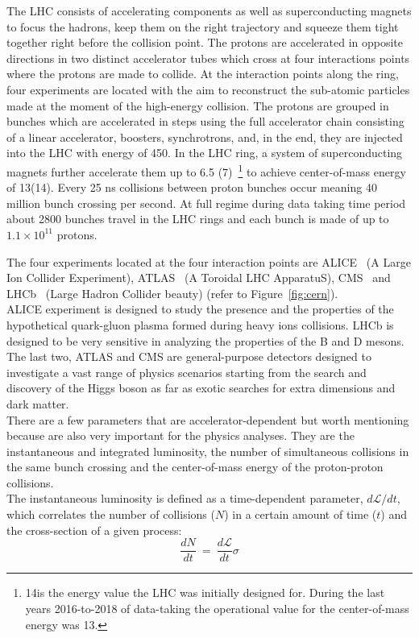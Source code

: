 The LHC consists of accelerating components as well as
superconducting magnets to focus the hadrons, keep them on the right
trajectory and squeeze them tight together right before the
collision point. 
The protons are accelerated in opposite directions in two distinct
accelerator tubes which cross at four interactions points where the
protons are made to collide. At the interaction points along the ring,
four experiments are located with the aim to reconstruct the
sub-atomic particles made at the moment of the high-energy collision.
The protons are grouped in bunches which are
accelerated in steps using the full accelerator chain consisting of a linear
accelerator, boosters, synchrotrons, and, in the end, they are injected
into the LHC with energy of 450\GeV. In the LHC ring, a system of
superconducting magnets further accelerate them up to 6.5\TeV
(7\TeV)~\footnote{14\TeV is the energy value the LHC was initially designed for. During the last years
  2016-to-2018 of data-taking the operational value for the center-of-mass energy was 13\TeV.}
to achieve center-of-mass energy of 13\TeV (14\TeV). Every
25 ns collisions between proton bunches occur meaning 40 million
bunch crossing per second. At full regime during data taking time
period about 2800 bunches travel in the LHC rings and each bunch is
made of up to $1.1\times10^{11}$ protons.

The four experiments located at the four interaction points are
ALICE~\cite{alice_2008} (A Large Ion Collider Experiment),
ATLAS~\cite{atlas_2008} (A Toroidal LHC ApparatuS),
CMS~\cite{cms_2008} and LHCb~\cite{lhcb_2008} (Large Hadron Collider
beauty) (refer to Figure~\ref{fig:cern}).\\
 ALICE experiment is designed
to study the presence and the properties of the hypothetical
quark-gluon plasma formed during heavy ions collisions. LHCb is
designed to be very sensitive in analyzing the properties of the B and D
mesons. The last two, ATLAS and CMS are general-purpose detectors
designed to investigate a vast range of physics scenarios starting
from the search and discovery of the Higgs boson as far as exotic
searches for extra dimensions
and dark matter. \\

There are a few parameters that are accelerator-dependent but worth
mentioning because are also very important for the
physics analyses. They are the instantaneous and integrated luminosity, the
number of simultaneous collisions in the same bunch crossing and the
center-of-mass energy of the proton-proton collisions.\\
The instantaneous luminosity is defined as a time-dependent
parameter, $d\mathcal{L}/dt$, which correlates the number of collisions
($N$) in a certain amount of time ($t$) and the cross-section of a
given process:
\begin{equation}
\label{eq:instalumi}
\frac{dN}{dt} \: = \: \frac{d\mathcal{L}}{dt}\sigma
\end{equation}

